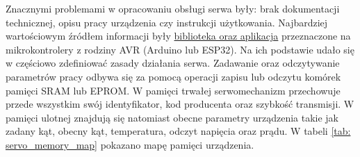 Znacznymi problemami w opracowaniu obsługi serwa były: brak dokumentacji technicznej, opisu pracy urządzenia czy instrukcji użytkowania. Najbardziej wartościowym źródłem informacji były \href{https://www.waveshare.com/wiki/ST3020_Servo#Software}{biblioteka oraz aplikacja} przeznaczone na mikrokontrolery z rodziny AVR (Arduino lub ESP32). Na ich podstawie udało się w częściowo zdefiniować zasady działania serwa. Zadawanie oraz odczytywanie parametrów pracy odbywa się za pomocą operacji zapisu lub odczytu komórek pamięci SRAM lub EPROM. W pamięci trwałej serwomechanizm przechowuje przede wszystkim swój identyfikator, kod producenta oraz szybkość transmisji. W pamięci ulotnej znajdują się natomiast obecne parametry urządzenia takie jak zadany kąt, obecny kąt, temperatura, odczyt napięcia oraz prądu. W tabeli \ref{tab: servo_memory_map} pokazano mapę pamięci urządzenia.
